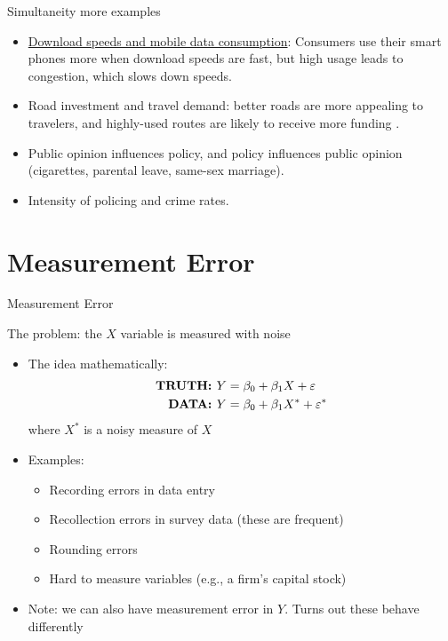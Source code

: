 \documentclass[aspectratio=169,11pt]{beamer}
\begin{document}
\begin{frame}{Simultaneity more examples}
\begin{itemize}
	\item \href{https://www.ptscott.com/papers/telecom_infrastructure.pdf}{Download speeds and mobile data consumption}:
		Consumers use their smart phones more when download speeds are fast, but high usage leads to congestion, which slows
		down speeds.

	\bigskip
	\item Road investment and travel demand: better roads are more appealing to travelers, and highly-used routes are likely
		to receive more funding .

	\bigskip
	\item Public opinion influences policy, and policy influences public opinion (cigarettes, parental leave, same-sex marriage). 

	\bigskip
	\item Intensity of policing and crime rates. 
\end{itemize}
\end{frame}


\section{Measurement Error}


\begin{frame}{Measurement Error}

The problem: the $X$ variable is measured with noise

\begin{itemize}
	\item The idea mathematically:
		\begin{align*}
			\text{\bf{TRUTH}: } Y &= \beta_0 + \beta_1 X + \varepsilon \\
			\text{\bf{DATA}: }  Y &= \beta_0 + \beta_1 X^* + \varepsilon^*
		\end{align*}
		where $X^*$ is a noisy measure of $X$
	\item Examples: 
	\begin{itemize}
		\item Recording errors in data entry
		\item Recollection errors in survey data (these are frequent)
		\item Rounding errors
		\item Hard to measure variables (e.g., a firm's capital stock)
	\end{itemize}
	\item Note: we can also have measurement error in $Y$. Turns out these behave differently
\end{itemize}

	
\end{frame}
\end{document}
